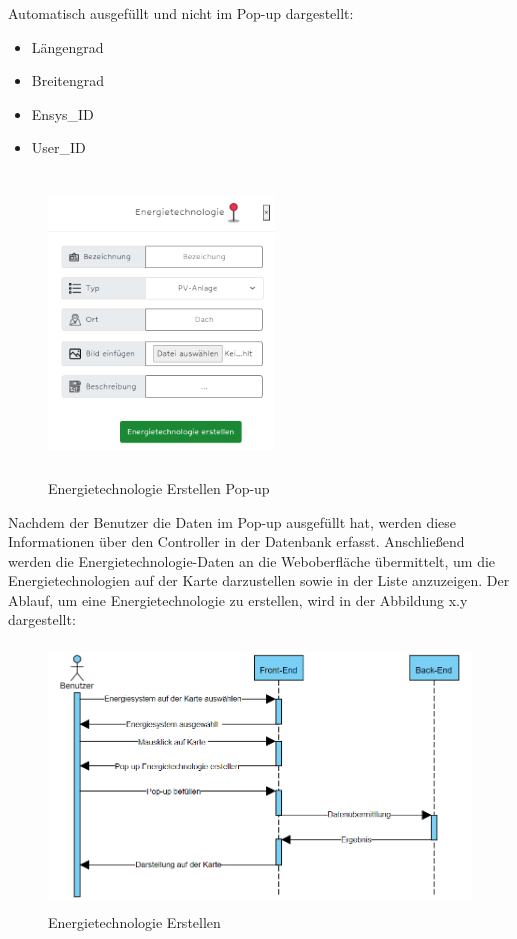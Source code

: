 Automatisch ausgefüllt und nicht im Pop-up dargestellt:
\begin{itemize}
	\item Längengrad 
	\item Breitengrad
	\item Ensys\_ID
	\item User\_ID
\end{itemize}
\begin{figure}[h]
	\centering
	\includegraphics[height=8cm,width=6cm]{images/ETerstellenPop}
	\caption{Energietechnologie Erstellen Pop-up}
	\label{fig:CSS_System}
\end{figure}
\newpage
Nachdem der Benutzer die Daten im Pop-up ausgefüllt hat, werden diese Informationen über den Controller in der Datenbank erfasst. Anschließend werden die Energietechnologie-Daten an die Weboberfläche übermittelt, um die Energietechnologien auf der Karte darzustellen sowie in der Liste anzuzeigen. Der Ablauf, um eine Energietechnologie zu erstellen, wird in der Abbildung x.y dargestellt:
 \begin{figure}[h]
 	\centering
 	\includegraphics[height=7cm,width=14cm]{images/ETerstellen}
 	\caption{Energietechnologie Erstellen}
 	\label{fig:CSS_System}
 \end{figure}

